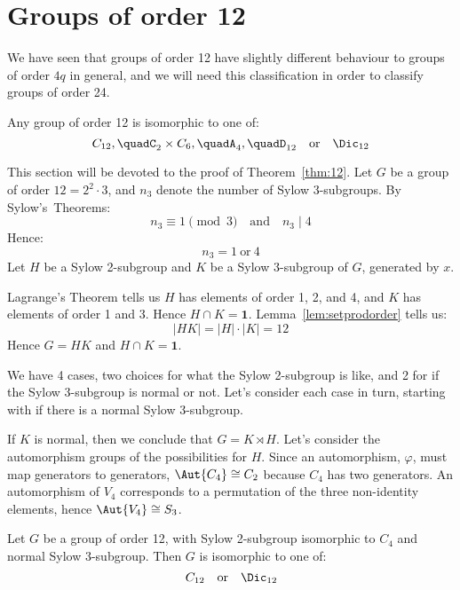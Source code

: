 \section{Groups of order 12}
We have seen that groups of order 12 have slightly different behaviour to groups of order \(4q\) in general, and we will
need this classification in order to classify groups of order 24.

\begin{theorem}\label{thm:12}
    Any group of order 12 is isomorphic to one of:
    \[
        C_{12}, \quad%
        C_2 \times C_6, \quad%
        A_4, \quad%
        D_{12} \quad \text{or} \quad%
        \Dic_{12}
    \]
\end{theorem}

This section will be devoted to the proof of Theorem~\ref{thm:12}.
Let \(G\) be a group of order \(12 = 2^2 \cdot 3\), and \(n_3\) denote the number of Sylow 3-subgroups.
By Sylow's~Theorems:
\[n_3 \equiv 1 \pmod{3} \quad \text{and} \quad n_3 \mid 4\]
Hence:
\[n_3 = 1 \ \text{or} \ 4\]
Let \(H\) be a Sylow 2-subgroup and \(K\) be a Sylow 3-subgroup of \(G\), generated by \(x\).

Lagrange's Theorem tells us \(H\) has elements of order 1, 2, and 4, and \(K\) has elements of order 1 and 3.
Hence \(H \cap K = \bm{1}\).
Lemma~\ref{lem:setprodorder} tells us:
\[|HK| = |H| \cdot |K| = 12\]
Hence \(G = HK\) and \(H \cap K = \bm{1}\).

We have 4 cases, two choices for what the Sylow 2-subgroup is like, and 2 for if the Sylow 3-subgroup is normal or not.
Let's consider each case in turn, starting with if there is a normal Sylow 3-subgroup.

If \(K\) is normal, then we conclude that \(G = K \rtimes H\).
Let's consider the automorphism groups of the possibilities for \(H\).
Since an automorphism, \(\varphi\), must map generators to generators, \(\Aut{C_4} \cong C_2\) because \(C_4\) has two
generators.
An automorphism of \(V_4\) corresponds to a permutation of the three
non-identity elements, hence \(\Aut{V_4} \cong S_3\).


\begin{lemma}
    Let \(G\) be a group of order 12, with Sylow 2-subgroup isomorphic to \(C_4\) and normal Sylow 3-subgroup.
    Then \(G\) is isomorphic to one of:
    \[
        C_{12} \quad \text{or} \quad%
        \Dic_{12}
    \]
\end{lemma}


